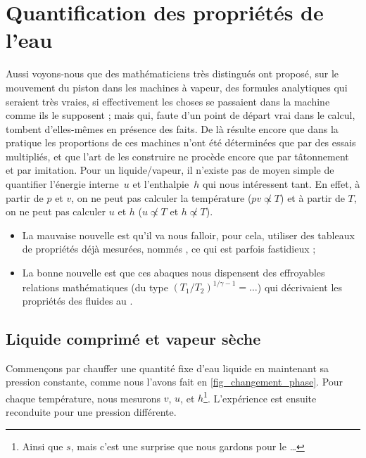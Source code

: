 \section{Quantification des propriétés de l’eau}

			Aussi voyons-nous que des mathématiciens très distingués ont proposé, sur le mouvement du piston dans les machines à vapeur, des formules analytiques qui seraient très vraies, si effectivement les choses se passaient dans la machine comme ils le supposent ; mais qui, faute d’un point de départ vrai dans le calcul, tombent d’elles-mêmes en présence des faits. De là résulte encore que dans la pratique les proportions de ces machines n’ont été déterminées que par des essais multipliés, et que l’art de les construire ne procède encore que par tâtonnement et par imitation.
	Pour un liquide/vapeur, il n’existe pas de moyen simple de quantifier l’énergie interne~$u$ et l’enthalpie~$h$ qui nous intéressent tant. En effet, à partir de $p$ et $v$, on ne peut pas calculer la température ($p v \not\propto T$) et à partir de $T$, on ne peut pas calculer $u$ et $h$ ($u \not\propto T$ et $h \not\propto T$).
	
	\begin{itemize}
		\item La mauvaise nouvelle est qu’il va nous falloir, pour cela, utiliser des tableaux de propriétés déjà mesurées, nommés , ce qui est parfois fastidieux ;
		\item La bonne nouvelle est que ces abaques nous dispensent des effroyables relations mathématiques (du type $(T_1/T_2)^{1/\gamma-1} = \ldots$) qui décrivaient les propriétés des fluides au \coursquatre.
	\end{itemize}
 
	\subsection{Liquide comprimé et vapeur sèche}
 		
		Commençons par chauffer une quantité fixe d’eau liquide en maintenant sa pression constante, comme nous l’avons fait en \cref{fig_changement_phase}. Pour chaque température, nous mesurons $v$, $u$, et $h$\footnote{Ainsi que $s$, mais c’est une surprise que nous gardons pour le \courshuitshort…}. L’expérience est ensuite reconduite pour une pression différente.
		
